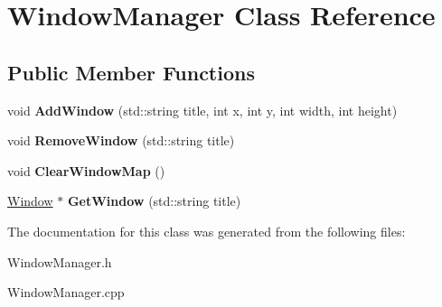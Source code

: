 \hypertarget{class_window_manager}{\section{Window\-Manager Class Reference}
\label{class_window_manager}
}
\subsection*{Public Member Functions}
\begin{DoxyCompactItemize}
\item 
\hypertarget{class_window_manager_afcdf891c83b309ae396769da2f855682}{void {\bfseries Add\-Window} (std\-::string title, int x, int y, int width, int height)}\label{class_window_manager_afcdf891c83b309ae396769da2f855682}

\item 
\hypertarget{class_window_manager_ad07b9799722dad333040151f0f48c469}{void {\bfseries Remove\-Window} (std\-::string title)}\label{class_window_manager_ad07b9799722dad333040151f0f48c469}

\item 
\hypertarget{class_window_manager_ac03c930e4f89fc3572363a8026f9a48e}{void {\bfseries Clear\-Window\-Map} ()}\label{class_window_manager_ac03c930e4f89fc3572363a8026f9a48e}

\item 
\hypertarget{class_window_manager_aaa65e4a0aba6ad898f3625356679a65e}{\hyperlink{class_window}{Window} $\ast$ {\bfseries Get\-Window} (std\-::string title)}\label{class_window_manager_aaa65e4a0aba6ad898f3625356679a65e}

\end{DoxyCompactItemize}


The documentation for this class was generated from the following files\-:\begin{DoxyCompactItemize}
\item 
Window\-Manager.\-h\item 
Window\-Manager.\-cpp\end{DoxyCompactItemize}
